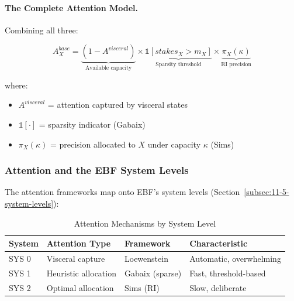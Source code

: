 \paragraph{The Complete Attention Model.}
Combining all three:

\begin{equation}
\boxed{
A^{base}_X = \underbrace{(1 - A^{visceral})}_{\text{Available capacity}} \times 
\underbrace{\mathbb{1}[stakes_X > m_X]}_{\text{Sparsity threshold}} \times 
\underbrace{\pi_X(\kappa)}_{\text{RI precision}}
}
\label{eq:complete-attention}
\end{equation}

where:
\begin{itemize}
\item $A^{visceral}$ = attention captured by visceral states
\item $\mathbb{1}[\cdot]$ = sparsity indicator (Gabaix)
\item $\pi_X(\kappa)$ = precision allocated to $X$ under capacity $\kappa$ (Sims)
\end{itemize}

\subsubsection{Attention and the EBF System Levels}
\label{subsubsec:attention-systems}

The attention frameworks map onto EBF's system levels 
(Section~\ref{subsec:11-5-system-levels}):

\begin{table}[htbp]
\centering
\caption{Attention Mechanisms by System Level}
\label{tab:attention-systems}
\renewcommand{\arraystretch}{1.4}
\begin{tabular}{@{}llll@{}}
\toprule
\textbf{System} & \textbf{Attention Type} & \textbf{Framework} & \textbf{Characteristic} \\
\midrule
SYS 0 & Visceral capture & Loewenstein & Automatic, overwhelming \\
SYS 1 & Heuristic allocation & Gabaix (sparse) & Fast, threshold-based \\
SYS 2 & Optimal allocation & Sims (RI) & Slow, deliberate \\
\bottomrule
\end{tabular}
\end{table}

